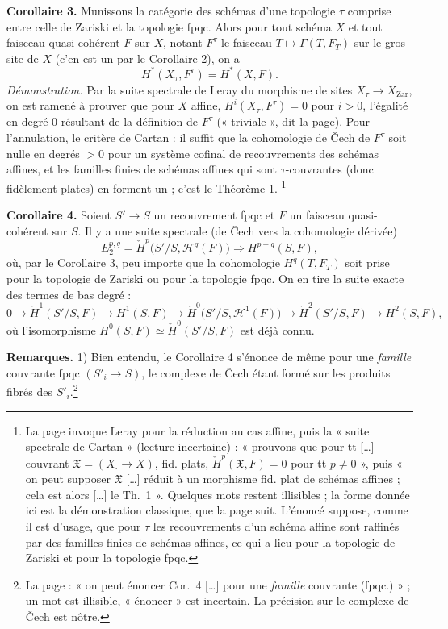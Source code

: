 \documentclass[11pt,a4paper]{article}
\begin{document}
\textbf{Corollaire 3.} Munissons la catégorie des schémas d'une topologie
$\tau$ comprise entre celle de Zariski et la topologie fpqc. Alors pour tout
schéma $X$ et tout faisceau quasi-cohérent $F$ sur $X$, notant $F^{\tau}$ le
faisceau $T \mapsto \Gamma(T, F_T)$ sur le gros site de $X$ (c'en est un par
le Corollaire 2), on a
\[
  H^{*}(X_{\tau}, F^{\tau}) = H^{*}(X, F) .
\]
\emph{Démonstration.} Par la suite spectrale de Leray du morphisme de sites
$X_{\tau} \to X_{\mathrm{Zar}}$, on est ramené à prouver que pour $X$ affine,
$H^i(X_{\tau}, F^{\tau}) = 0$ pour $i > 0$, l'égalité en degré $0$ résultant de
la définition de $F^{\tau}$ (« triviale », dit la page). Pour l'annulation,
le critère de Cartan : il suffit que
la cohomologie de Čech de $F^{\tau}$ soit nulle en degrés $> 0$ pour un système
cofinal de recouvrements des schémas affines, et les familles finies de
schémas affines qui sont $\tau$-couvrantes (donc fidèlement plates) en forment
un ; c'est le Théorème 1.%
\footnote{La page invoque Leray pour la réduction au cas affine, puis la
« suite spectrale de Cartan » (lecture incertaine) : « prouvons que pour tt
[…] couvrant $\mathfrak{X} = (X_{\cdot} \to X)$, fid. plats,
$\check{H}^p(\mathfrak{X}, F) = 0$ pour tt $p \neq 0$ », puis « on peut
supposer $\mathfrak{X}$ […] réduit à un morphisme fid. plat de schémas affines ;
cela est alors […] le Th.~1 ». Quelques mots restent illisibles ; la forme
donnée ici est la démonstration classique, que la page suit. L'énoncé suppose, comme il
est d'usage, que pour $\tau$ les recouvrements d'un schéma affine sont
raffinés par des familles finies de schémas affines, ce qui a lieu pour la
topologie de Zariski et pour la topologie fpqc.}

\textbf{Corollaire 4.} Soient $S' \to S$ un recouvrement fpqc et $F$ un
faisceau quasi-cohérent sur $S$. Il y a une suite spectrale (de Čech vers la
cohomologie dérivée)
\[
  E_2^{p,q} = \check{H}^p\bigl(S'/S, \mathcal{H}^q(F)\bigr) \Longrightarrow
  H^{p+q}(S, F) ,
\]
où, par le Corollaire 3, peu importe que la cohomologie $H^q(T, F_T)$ soit
prise pour la topologie de Zariski ou pour la topologie fpqc. On en tire la
suite exacte des termes de bas degré :
\[
  0 \to \check{H}^1(S'/S, F) \to H^1(S, F) \to
  \check{H}^0\bigl(S'/S, \mathcal{H}^1(F)\bigr) \to \check{H}^2(S'/S, F) \to
  H^2(S, F) ,
\]
où l'isomorphisme $H^0(S, F) \simeq \check{H}^0(S'/S, F)$ est déjà connu.

\textbf{Remarques.} 1) Bien entendu, le Corollaire 4 s'énonce de même pour une
\emph{famille} couvrante fpqc $(S'_i \to S)$, le complexe de Čech étant formé
sur les produits fibrés des $S'_i$.\footnote{La page : « on peut énoncer
Cor.~4 […] pour une \emph{famille} couvrante (fpqc.) » ; un mot est illisible,
« énoncer » est incertain. La précision sur le complexe de Čech est nôtre.}
\end{document}
